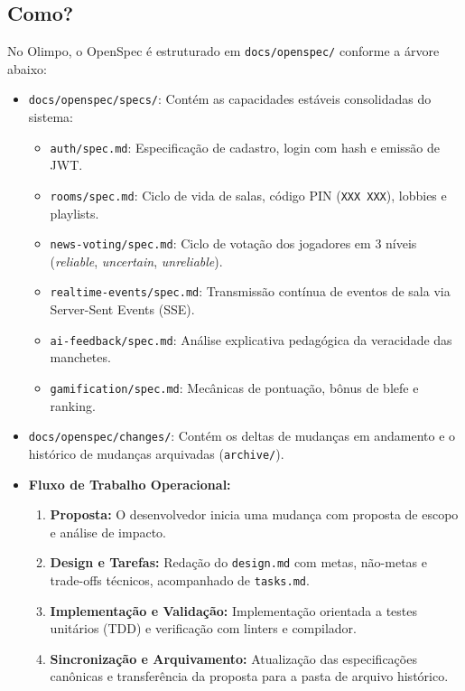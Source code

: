 \documentclass[12pt,a4paper]{article}
\begin{document}
\subsection{Como?}
No Olimpo, o OpenSpec é estruturado em \texttt{docs/openspec/} conforme a árvore abaixo:
\begin{itemize}
  \item \texttt{docs/openspec/specs/}: Contém as capacidades estáveis consolidadas do sistema:
  \begin{itemize}
    \item \texttt{auth/spec.md}: Especificação de cadastro, login com hash e emissão de JWT.
    \item \texttt{rooms/spec.md}: Ciclo de vida de salas, código PIN (\texttt{XXX XXX}), lobbies e playlists.
    \item \texttt{news-voting/spec.md}: Ciclo de votação dos jogadores em 3 níveis (\textit{reliable}, \textit{uncertain}, \textit{unreliable}).
    \item \texttt{realtime-events/spec.md}: Transmissão contínua de eventos de sala via Server-Sent Events (SSE).
    \item \texttt{ai-feedback/spec.md}: Análise explicativa pedagógica da veracidade das manchetes.
    \item \texttt{gamification/spec.md}: Mecânicas de pontuação, bônus de blefe e ranking.
  \end{itemize}
  \item \texttt{docs/openspec/changes/}: Contém os deltas de mudanças em andamento e o histórico de mudanças arquivadas (\texttt{archive/}).
  \item \textbf{Fluxo de Trabalho Operacional:}
  \begin{enumerate}
    \item \textbf{Proposta:} O desenvolvedor inicia uma mudança com proposta de escopo e análise de impacto.
    \item \textbf{Design e Tarefas:} Redação do \texttt{design.md} com metas, não-metas e trade-offs técnicos, acompanhado de \texttt{tasks.md}.
    \item \textbf{Implementação e Validação:} Implementação orientada a testes unitários (TDD) e verificação com linters e compilador.
    \item \textbf{Sincronização e Arquivamento:} Atualização das especificações canônicas e transferência da proposta para a pasta de arquivo histórico.
  \end{enumerate}
\end{itemize}
\end{document}

